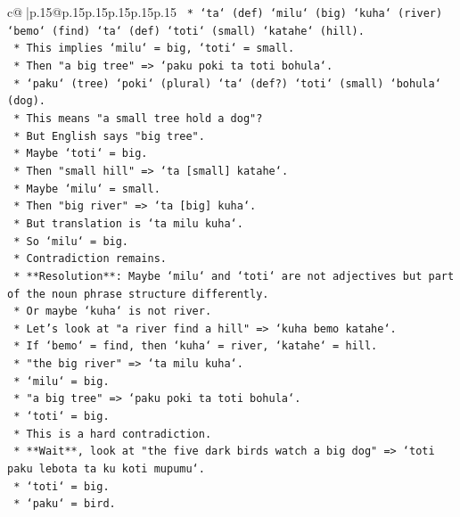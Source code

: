 \documentclass{article}
\begin{document}
{\begin{supertabular}{c@{$\;$}|p{.15\linewidth}@{}p{.15\linewidth}p{.15\linewidth}p{.15\linewidth}p{.15\linewidth}p{.15\linewidth}}
{{{\texttt{            *   `ta` (def) `milu` (big) `kuha` (river) `bemo` (find) `ta` (def) `toti` (small) `katahe` (hill).} \\
\texttt{            *   This implies `milu` = big, `toti` = small.} \\
\texttt{        *   Then "a big tree" => `paku poki ta toti bohula`.} \\
\texttt{            *   `paku` (tree) `poki` (plural) `ta` (def?) `toti` (small) `bohula` (dog).} \\
\texttt{            *   This means "a small tree hold a dog"?} \\
\texttt{            *   But English says "big tree".} \\
\texttt{            *   Maybe `toti` = big.} \\
\texttt{            *   Then "small hill" => `ta {[}small{]} katahe`.} \\
\texttt{            *   Maybe `milu` = small.} \\
\texttt{            *   Then "big river" => `ta {[}big{]} kuha`.} \\
\texttt{            *   But translation is `ta milu kuha`.} \\
\texttt{            *   So `milu` = big.} \\
\texttt{            *   Contradiction remains.} \\
\texttt{    *   **Resolution**: Maybe `milu` and `toti` are not adjectives but part of the noun phrase structure differently.} \\
\texttt{    *   Or maybe `kuha` is not river.} \\
\texttt{    *   Let's look at "a river find a hill" => `kuha bemo katahe`.} \\
\texttt{        *   If `bemo` = find, then `kuha` = river, `katahe` = hill.} \\
\texttt{    *   "the big river" => `ta milu kuha`.} \\
\texttt{        *   `milu` = big.} \\
\texttt{    *   "a big tree" => `paku poki ta toti bohula`.} \\
\texttt{        *   `toti` = big.} \\
\texttt{    *   This is a hard contradiction.} \\
\texttt{    *   **Wait**, look at "the five dark birds watch a big dog" => `toti paku lebota ta ku koti mupumu`.} \\
\texttt{        *   `toti` = big.} \\
\texttt{        *   `paku` = bird.} \\
}}}
\end{supertabular}}
\end{document}
